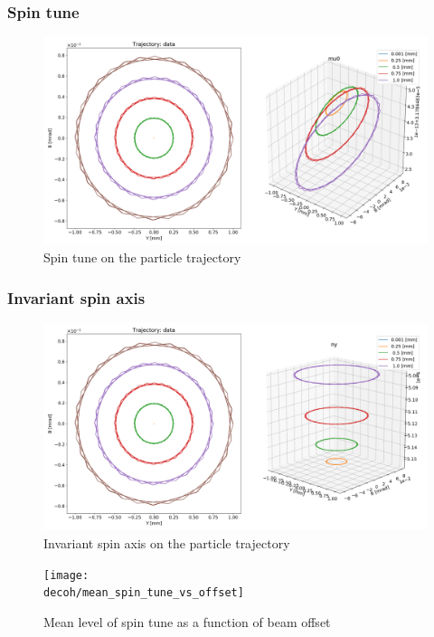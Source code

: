 \documentclass{beamer}
\newcommand{\home}{\string~}
\newcommand{\Artem}{\home/REPOS/COSYINF/img/Artem}
\newcommand{\decoh}{\Artem/decoherence_frequency_dependence}
\begin{document}
\begin{frame}\frametitle{Spin tune}
  \begin{figure}[H]
    \centering
    \includegraphics[width=\linewidth]{../img/SEMINAR/SPIN_TUNE_VS_YB_DATA_TRAJ}
    \caption{Spin tune on the particle trajectory\label{fig:tune_on_traj}}
  \end{figure}
\end{frame}

\begin{frame}\frametitle{Invariant spin axis}
  \begin{figure}[H]
    \centering
    \includegraphics[width=\linewidth]{../img/SEMINAR/NY_VS_YB_DATA_TRAJ}
    \caption{Invariant spin axis on the particle trajectory\label{fig:axis_on_traj}}
  \end{figure}
\end{frame}

\begin{frame}
  \begin{figure}[H]
    \centering
    \texttt{[image: \\decoh/mean\_spin\_tune\_vs\_offset]}
    \caption{Mean level of spin tune as a function of beam offset}
  \end{figure}
\end{frame}
\end{document}
